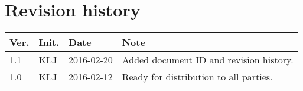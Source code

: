 \chapter*{Revision history}
\label{app:rev_his}


\begin{tabular}{b{1cm} b{1cm} b{2cm} b{8cm}}
    \textbf{Ver.} & \textbf{Init.} & \textbf{Date} & \textbf{Note} \\
    \hline
    1.1 & KLJ & 2016-02-20 & Added document ID and revision history. \\
    1.0 & KLJ & 2016-02-12 & Ready for distribution to all parties. \\
\end{tabular}
